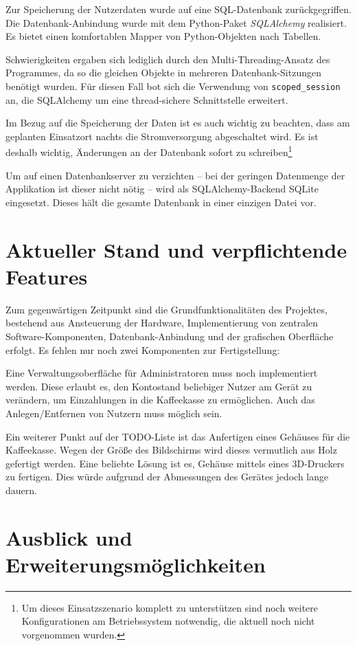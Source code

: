 \documentclass[11pt,a4paper]{IEEEtran}
\begin{document}
Zur Speicherung der Nutzerdaten wurde auf eine SQL-Datenbank zurückgegriffen.
Die Datenbank-Anbindung wurde mit dem Python-Paket
\emph{SQLAlchemy}\autocite{SQLAlchemy} realisiert. Es bietet einen komfortablen
Mapper von Python-Objekten nach Tabellen. 

Schwierigkeiten ergaben sich lediglich durch den Multi-Threading-Ansatz des 
Programmes, da so die gleichen Objekte in mehreren Datenbank-Sitzungen benötigt
wurden. Für diesen Fall bot sich die Verwendung von \texttt{scoped\_session}
an, die SQLAlchemy um eine thread-sichere Schnittstelle erweitert.

Im Bezug auf die Speicherung der Daten ist es auch wichtig zu beachten, dass am
geplanten Einsatzort nachts die Stromversorgung abgeschaltet wird. Es ist 
deshalb wichtig, Änderungen an der Datenbank sofort zu schreiben\footnote{Um
    dieses Einsatzszenario komplett zu unterstützen sind noch weitere
    Konfigurationen am Betriebssystem notwendig, die aktuell noch nicht
vorgenommen wurden.}

Um auf einen Datenbankserver zu verzichten -- bei der geringen Datenmenge der
Applikation ist dieser nicht nötig -- wird als SQLAlchemy-Backend SQLite
eingesetzt. Dieses hält die gesamte Datenbank in einer einzigen Datei vor. 

\section{Aktueller Stand und verpflichtende Features}

Zum gegenwärtigen Zeitpunkt sind die Grundfunktionalitäten des Projektes,
bestehend aus Ansteuerung der Hardware, Implementierung von zentralen 
Software-Komponenten, Datenbank-Anbindung und der grafischen Oberfläche 
erfolgt. Es fehlen nur noch zwei Komponenten zur Fertigstellung:

Eine Verwaltungsoberfläche für Administratoren muss noch implementiert werden.
Diese erlaubt es, den Kontostand beliebiger Nutzer am Gerät zu verändern, um
Einzahlungen in die Kaffeekasse zu ermöglichen. Auch das Anlegen/Entfernen
von Nutzern muss möglich sein.

Ein weiterer Punkt auf der TODO-Liste ist das Anfertigen eines Gehäuses für die
Kaffeekasse. Wegen der Größe des Bildschirms wird dieses vermutlich aus Holz
gefertigt werden. Eine beliebte Lösung ist es, Gehäuse mittels eines 3D-Druckers
zu fertigen. Dies würde aufgrund der Abmessungen des Gerätes jedoch lange
dauern.

\section{Ausblick und Erweiterungsmöglichkeiten}
\end{document}
